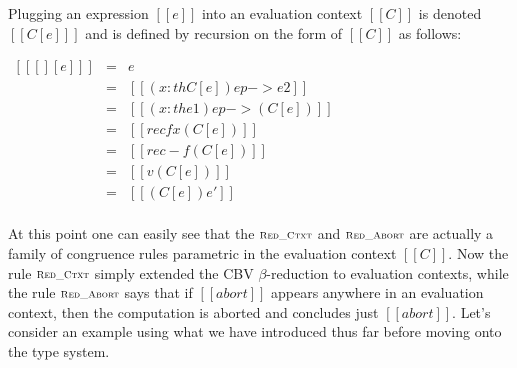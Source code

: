 \begin{definition}
  \label{def:FS-ectx-plug}
  Plugging an expression $[[e]]$ into an evaluation context $[[C]]$ is denoted $[[C[e] ]]$
  and is defined by recursion on the form of $[[C]]$ as follows:
  \begin{center}
    \begin{math}
      \begin{array}{rll}
        [[ [] [e] ]]                    & = & e\\
        [[(( x : th C ) ep -> e2)[e] ]] & = & [[( x : th C[e] ) ep -> e2]]\\
        [[(( x : th e1 ) ep -> C)[e] ]] & = & [[( x : th e1 ) ep -> (C[e]) ]]\\
        [[(rec f x C)[e] ]]             & = & [[rec f x (C[e]) ]]\\
        [[(rec - f C)[e] ]]             & = & [[rec - f (C[e]) ]]\\
        [[(v C)[e] ]]                   & = & [[v (C[e]) ]]\\
        [[(C e')[e] ]]                  & = & [[(C[e]) e']]\\
      \end{array}
    \end{math}
  \end{center}
\end{definition}
At this point one can easily see that the $\textsc{\scriptsize Red\_Ctxt}$
and $\textsc{\scriptsize Red\_Abort}$ are actually a family of congruence
rules parametric in the evaluation context $[[C]]$. Now the rule
$\textsc{\scriptsize Red\_Ctxt}$ simply extended the CBV $\beta$-reduction to
evaluation contexts, while the rule $\textsc{\scriptsize Red\_Abort}$ says
that if $[[abort]]$ appears anywhere in an evaluation context, then the
computation is aborted and concludes just $[[abort]]$.  Let's consider
an example using what we have introduced thus far before moving onto
the type system.

